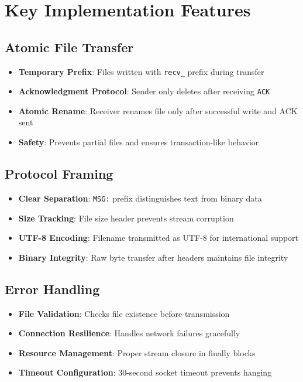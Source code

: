 \documentclass[12pt, letterpaper]{article}
\begin{document}
\section{Key Implementation Features}

\subsection{Atomic File Transfer}
\begin{itemize}
    \item \textbf{Temporary Prefix}: Files written with \texttt{recv\_} prefix during transfer
    \item \textbf{Acknowledgment Protocol}: Sender only deletes after receiving \texttt{ACK}
    \item \textbf{Atomic Rename}: Receiver renames file only after successful write and ACK sent
    \item \textbf{Safety}: Prevents partial files and ensures transaction-like behavior
\end{itemize}

\subsection{Protocol Framing}
\begin{itemize}
    \item \textbf{Clear Separation}: \texttt{MSG:} prefix distinguishes text from binary data
    \item \textbf{Size Tracking}: File size header prevents stream corruption
    \item \textbf{UTF-8 Encoding}: Filename transmitted as UTF-8 for international support
    \item \textbf{Binary Integrity}: Raw byte transfer after headers maintains file integrity
\end{itemize}

\subsection{Error Handling}
\begin{itemize}
    \item \textbf{File Validation}: Checks file existence before transmission
    \item \textbf{Connection Resilience}: Handles network failures gracefully
    \item \textbf{Resource Management}: Proper stream closure in finally blocks
    \item \textbf{Timeout Configuration}: 30-second socket timeout prevents hanging
\end{itemize}
\end{document}
